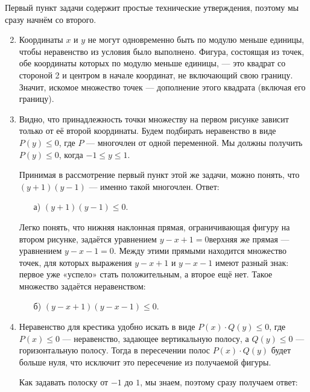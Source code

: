 
Первый пункт задачи содержит простые технические утверждения, поэтому мы сразу начнём со второго.

\begin{enumerate}
\setcounter{enumi}{1}

\item Координаты $x$ и $y$ не могут одновременно быть по модулю меньше единицы, чтобы неравенство из условия было выполнено. Фигура, состоящая из точек, обе координаты которых по модулю меньше единицы, — это квадрат со стороной 2 и центром в начале координат, не включающий свою границу. Значит, искомое множество точек — дополнение этого квадрата (включая его границу).

\item Видно, что принадлежность точки множеству на первом рисунке зависит только от её второй координаты. Будем подбирать неравенство в виде $P(y) \le 0$, где $P$ — многочлен от одной переменной. Мы должны получить $P(y) \le 0$, когда $-1 \le y \le 1$.

Принимая в рассмотрение первый пункт этой же задачи, можно понять, что $(y+1)(y-1)$ — именно такой многочлен. Ответ:

\begin{enumerate}
	\item[а)] $(y+1)(y-1) \le 0$.
\end{enumerate}

Легко понять, что нижняя наклонная прямая, ограничивающая фигуру на втором рисунке, задаётся уравнением $y-x+1=0$\scolon верхняя же прямая — уравнением $y-x-1=0$. Между этими прямыми находится множество точек, для которых выражения $y-x+1$ и $y-x-1$ имеют разный знак: первое уже «успело» стать положительным, а второе ещё нет. Такое множество задаётся неравенством:

\begin{enumerate}
	\item[б)] $(y-x+1)(y-x-1) \le 0$.
\end{enumerate}

\item Неравенство для крестика удобно искать в виде $P(x) \cdot Q(y) \le 0$, где $P(x) \le 0$ — неравенство, задающее вертикальную полосу, а $Q(y) \le 0$ — горизонтальную полосу. Тогда в пересечении полос $P(x) \cdot Q(y)$ будет больше нуля, что исключит это пересечение из получаемой фигуры.

Как задавать полоску от $-1$ до $1$, мы знаем, поэтому сразу получаем ответ:


\end{enumerate}
